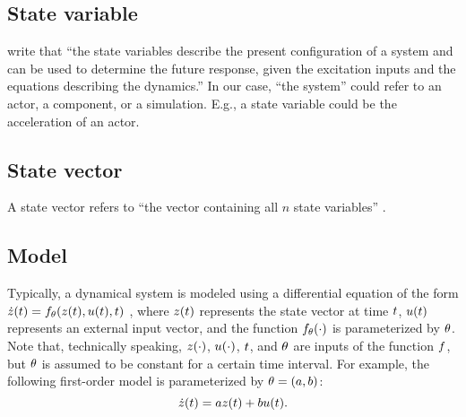 \subsection{State variable} 
\label{sec:state variable}
\textcite[p.~163]{dorf2011modern} write that ``the state variables describe the present configuration of a system and can be used to determine the future response, given the excitation inputs and the equations describing the dynamics.'' In our case, ``the system'' could refer to an actor, a component, or a simulation. E.g., a state variable could be the acceleration of an actor.



\subsection{State vector}
\label{sec:state vector}
A state vector refers to ``the vector containing all $n$ state variables'' \autocite[p.~233]{dorf2011modern}.



\subsection{Model}
\label{sec:model}

Typically, a dynamical system is modeled using a differential equation of the form $\dot{z}(t)=f_{\theta}(z(t), u(t), t)$ \autocite{norman2011control}, where $z(t)$ represents the state vector at time $t$, $u(t)$ represents an external input vector, and the function $f_{\theta}(\cdot)$ is parameterized by $\theta$.  Note that, technically speaking, $z(\cdot)$, $u(\cdot)$, $t$, and $\theta$ are inputs of the function $f$, but $\theta$ is assumed to be constant for a certain time interval. For example, the following first-order model is parameterized by $\theta=(a,b)$:
\begin{equation}
	\dot{z}(t) = a z(t) + b u(t).
\end{equation}





